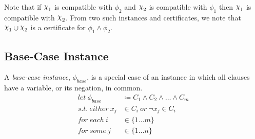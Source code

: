 Note that if $\rchi_1$ is compatible with $\phi_2$ and $\rchi_2$ is compatible with $\phi_1$ then $\rchi_1$ is compatible with $\rchi_2$.
From two such instances and certificates, we note that $\rchi_1 \cup \rchi_2$ is a certificate for $\phi_1 \land \phi_2$.


\subsection{Base-Case Instance}
\label{subsec:base-case-instance}

A \textit{base-case instance}, $\phi_{base}$, is a special case of an instance in which all clauses have a variable, or its negation, in common.
\begin{align*}
    let~ \phi_{base} & \coloneqq C_1 \land C_2 \land \ldots \land C_m \\
    s.t.~ either~ x_j & \in C_i~ or~ \lnot x_j \in C_i \\
    for~ each~ i & \in \{ 1 \dots m \} \\
    for~ some~ j & \in \{ 1 \dots n \}
\end{align*}

\begin{comment}
    Cascade of assignments:
        Assignments made due to Unit Clauses and Pure Literals.
        Cascades can be chained, e.g. assigning a Unit Clause may cause the formation of other unit clauses.
        A chain of Cascades is also a Cascade.

    Certificate:
        A set of assignments for variables s.t. a Cascade satisfies the rest of the SAT instance.

    Min-Certificate:
        A smallest set of assignments for variables s.t. a Cascade satisfies the rest of the SAT instance.

    Flattened Certificate:
        The complete set of assignments, both chosen and those by Cascade.

    Compatibility:
        Two certificates are compatible if there are no conflicts between their flattened versions.

    Applying a Certificate:
        Setting variables as per the certificate and following the resulting Cascade.

    Combining two certificates:
        Two certificates can be combined if they are compatible.
        The combined certificate is the union of assignments made by choice in either certificate.

\end{comment}
